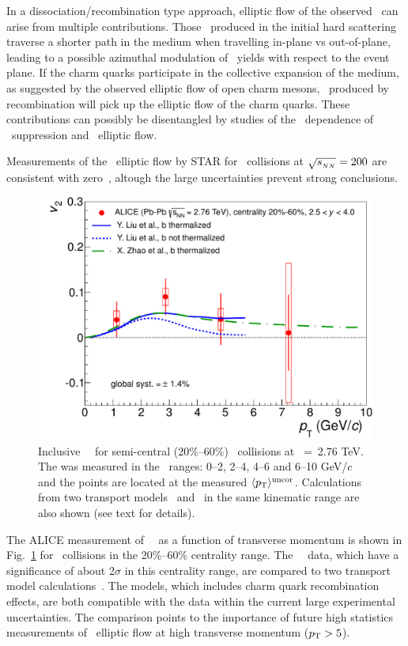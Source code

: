 In a dissociation/recombination type approach, elliptic flow of the observed \jpsi\ can arise from multiple 
contributions. Those \jpsi\ produced in the initial hard scattering traverse a shorter path in the medium when 
travelling in-plane vs out-of-plane, leading to a possible azimuthal modulation of \jpsi\ yields with respect
to the event plane. If the charm quarks participate in the collective expansion of the medium, as 
suggested by the observed elliptic flow of open charm mesons, \jpsi\ produced by recombination will 
pick up the elliptic flow of the charm quarks. These contributions can possibly be disentangled by 
studies of the \pT\ dependence of \jpsi\ suppression and \jpsi\ elliptic flow.

Measurements of the \jpsi\ elliptic flow by STAR for \AuAu\ collisions at $\sqrt{s_{_{NN}}} = 200$\GeV 
are consistent with zero~\cite{Adamczyk:2012pw}, altough the large uncertainties prevent strong conclusions.

\begin{figure}
\includegraphics[width=0.49\linewidth]{qqbarfigures/prl_fig4-eps-converted-to.pdf}
\caption{\label{fig:GR:v2ptcomp} Inclusive \jpsi\ \vpt\  for semi-central (20\%--60\%) \PbPb\ collisions at \rootsNN~=~2.76 TeV. The \vtwo was measured in the \pT\ ranges: 0--2, 2--4, 4--6 and 6--10 GeV/$c$ and the points are located at the measured  $\langle p_{\rm T} \rangle^{\rm uncor}$. Calculations from two transport models~\cite{Liu:2009gx} and~\cite{Zhao:2012gc} in the same kinematic range are also shown (see text for details).}
\end{figure}

The ALICE measurement of \jpsi\ \vtwo\ as a function of transverse momentum is shown in Fig.~\ref{fig:GR:v2ptcomp} for \PbPb\ collisions
in the 20\%--60\% centrality range.
The \jpsi\ \vtwo\ data, which have a significance of about 2$\sigma$ in this centrality range, are compared to two 
transport model calculations~\cite{Liu:2009gx,Zhao:2012gc}. The models, which includes charm quark recombination effects, 
are both compatible with the data within the current large experimental uncertainties. The comparison points to the 
importance of future high statistics measurements of \jpsi\ elliptic flow at high transverse momentum ($\mbox{$p_{\mathrm{T}}$} > 5$\GeVc).

